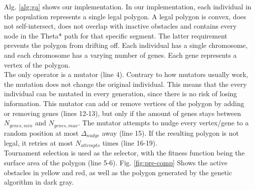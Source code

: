 Alg. \ref{alg:ga} shows our implementation. In our implementation, each individual in the population represents a single legal polygon. A legal polygon is convex, does not self-intersect, does not overlap with inactive obstacles and contains every node in the Theta* path for that specific segment. The latter requirement prevents the polygon from drifting off. Each individual has a single chromosome, and each chromosome has a varying number of genes. Each gene represents a vertex of the polygon.\\
The only operator is a mutator (line 4). Contrary to how mutators usually work, the mutation does not change the original individual. This means that the every individual can be mutated in every generation, since there is no risk of losing information. This mutator can add or remove vertices of the polygon by adding or removing genes (lines 12-13), but only if the amount of genes stays between $N_{genes,min}$ and $N_{genes,max}$. The mutator attempts to nudge every vertex/gene to a random position at most $\Delta_{nudge}$ away (line 15). If the resulting polygon is not legal, it retries at most $N_{attempts}$ times (line 16-19). \\
Tournament selection is used as the selector, with the fitness function being the surface area of the polygon (line 5-6). Fig. \ref{fig:pre-comp} Shows the active obstacles in yellow and red, as well as the polygon generated by the genetic algorithm in dark gray.\\




